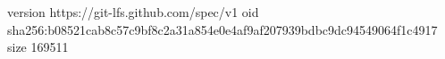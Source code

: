 version https://git-lfs.github.com/spec/v1
oid sha256:b08521cab8c57c9bf8c2a31a854e0e4af9af207939bdbc9dc94549064f1c4917
size 169511
